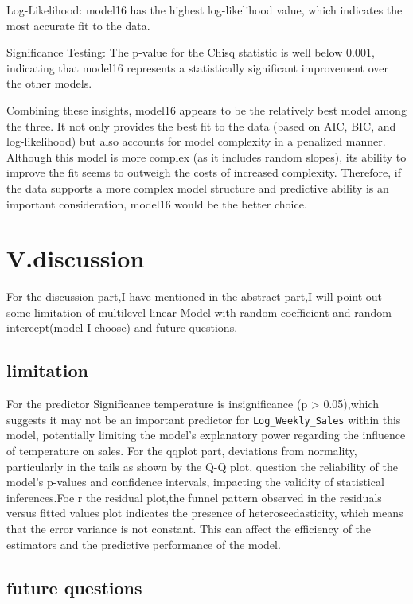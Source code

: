 \documentclass[
  letterpaper,
  DIV=11,
  numbers=noendperiod]{scrartcl}
\begin{document}
Log-Likelihood: model16 has the highest log-likelihood value, which
indicates the most accurate fit to the data.

Significance Testing: The p-value for the Chisq statistic is well below
0.001, indicating that model16 represents a statistically significant
improvement over the other models.

Combining these insights, model16 appears to be the relatively best
model among the three. It not only provides the best fit to the data
(based on AIC, BIC, and log-likelihood) but also accounts for model
complexity in a penalized manner. Although this model is more complex
(as it includes random slopes), its ability to improve the fit seems to
outweigh the costs of increased complexity. Therefore, if the data
supports a more complex model structure and predictive ability is an
important consideration, model16 would be the better choice.

\hypertarget{v.discussion}{%
\section{V.discussion}\label{v.discussion}}

For the discussion part,I have mentioned in the abstract part,I will
point out some limitation of multilevel linear Model with random
coefficient and random intercept(model I choose) and future questions.

\hypertarget{limitation}{%
\subsection{limitation}\label{limitation}}

For the predictor Significance temperature is insignificance (p
\textgreater{} 0.05),which suggests it may not be an important predictor
for \texttt{Log\_Weekly\_Sales} within this model, potentially limiting
the model's explanatory power regarding the influence of temperature on
sales. For the qqplot part, deviations from normality, particularly in
the tails as shown by the Q-Q plot, question the reliability of the
model's p-values and confidence intervals, impacting the validity of
statistical inferences.Foe r the residual plot,the funnel pattern
observed in the residuals versus fitted values plot indicates the
presence of heteroscedasticity, which means that the error variance is
not constant. This can affect the efficiency of the estimators and the
predictive performance of the model.

\hypertarget{future-questions}{%
\subsection{future questions}\label{future-questions}}
\end{document}
